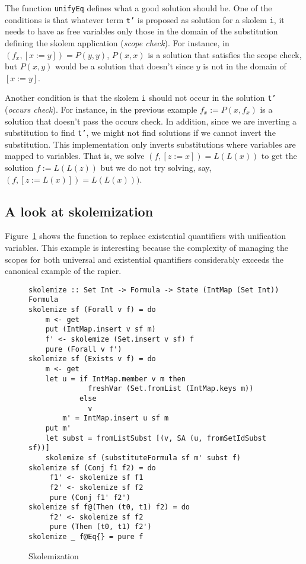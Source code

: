 \documentclass[sigconf]{acmart}
\newcommand{\tc}[1]{{\small\texttt{#1}}}
\begin{document}
The function \tc{unifyEq} defines what a good solution should be.
One of the conditions is that whatever term \tc{t'} is proposed
as solution for a skolem \tc{i}, it needs to have as free variables only those in the
domain of the substitution defining the skolem application
(\textit{scope check}). For instance, in $(f_x , [x:=y]) = P(y,y)$,
$P(x,x)$ is a solution that satisfies the scope check, but $P(x,y)$ would be a solution
that doesn't since $y$ is not in the domain of $[x:=y]$.

Another condition is that the skolem \tc{i} should not occur in the solution
\tc{t'} (\textit{occurs check}). For instance, in the previous example
$f_x:=P(x,f_x)$ is a solution that doesn't pass the occurs check. In addition,
since we are inverting a substitution to find
\tc{t'}, we might not find solutions if we cannot invert the
substitution. This implementation only inverts substitutions where
variables are mapped to variables. That is, we solve $(f, [z:=x]) = L(L(x))$
to get the solution $f:=L(L(z))$ but we do not try solving, say, $(f, [z:=L(x)]) = L(L(x)))$.


\subsection{A look at skolemization}
\label{sec:skolemize}

Figure~\ref{skolemization} shows the function to replace existential quantifiers
with unification variables. This example is interesting because the complexity of
managing the scopes for both universal and existential quantifiers
considerably exceeds the canonical example of the rapier.

\begin{figure}
\begin{verbatim}
skolemize :: Set Int -> Formula -> State (IntMap (Set Int)) Formula
skolemize sf (Forall v f) = do
    m <- get
    put (IntMap.insert v sf m)
    f' <- skolemize (Set.insert v sf) f
    pure (Forall v f')
skolemize sf (Exists v f) = do
    m <- get
    let u = if IntMap.member v m then
              freshVar (Set.fromList (IntMap.keys m))
            else
              v
        m' = IntMap.insert u sf m
    put m'
    let subst = fromListSubst [(v, SA (u, fromSetIdSubst sf))]
    skolemize sf (substituteFormula sf m' subst f)
skolemize sf (Conj f1 f2) = do
     f1' <- skolemize sf f1
     f2' <- skolemize sf f2
     pure (Conj f1' f2')
skolemize sf f@(Then (t0, t1) f2) = do
     f2' <- skolemize sf f2
     pure (Then (t0, t1) f2')
skolemize _ f@Eq{} = pure f
\end{verbatim}
\caption{Skolemization}
\label{skolemization}
\end{figure}
\end{document}
